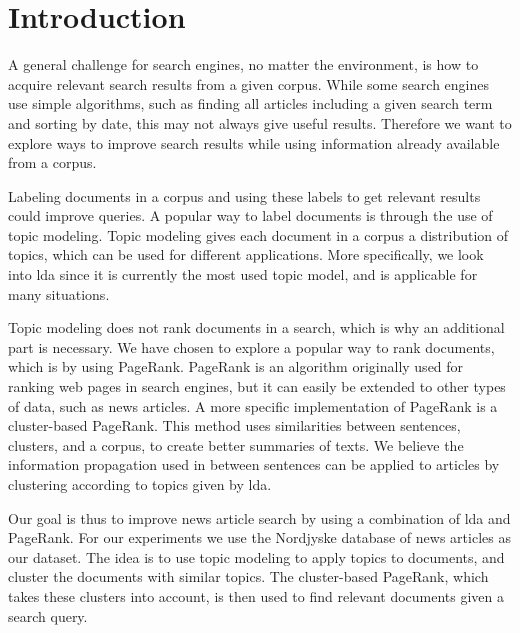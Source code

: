 \section{Introduction}
A general challenge for search engines, no matter the environment, is how to acquire relevant search results from a given corpus.
While some search engines use simple algorithms, such as finding all articles including a given search term and sorting by date, this may not always give useful results.
Therefore we want to explore ways to improve search results while using information already available from a corpus.

Labeling documents in a corpus and using these labels to get relevant results could improve queries.
A popular way to label documents is through the use of topic modeling. 
Topic modeling gives each document in a corpus a distribution of topics, which can be used for different applications.
More specifically, we look into \gls{lda} since it is currently the most used topic model, and is applicable for many situations\cite{lda}.

Topic modeling does not rank documents in a search, which is why an additional part is necessary.
We have chosen to explore a popular way to rank documents, which is by using PageRank.
PageRank is an algorithm originally used for ranking web pages in search engines, but it can easily be extended to other types of data, such as news articles.
A more specific implementation of PageRank is a cluster-based PageRank\cite{ClusterPageRank}.
This method uses similarities between sentences, clusters, and a corpus, to create better summaries of texts.
We believe the information propagation used in \cite{ClusterPageRank} between sentences can be applied to articles by clustering according to topics given by \gls{lda}.

Our goal is thus to improve news article search by using a combination of \gls{lda} and PageRank.
For our experiments we use the Nordjyske database of news articles as our dataset.
The idea is to use topic modeling to apply topics to documents, and cluster the documents with similar topics.
The cluster-based PageRank, which takes these clusters into account, is then used to find relevant documents given a search query.




